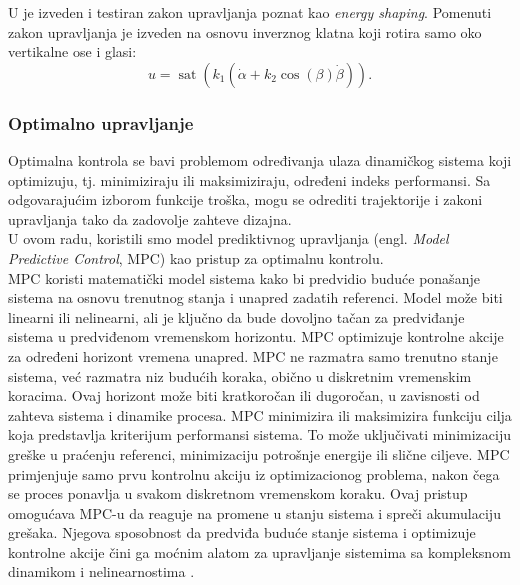 \documentclass[a4paper,11pt]{article}
\theoremstyle{definition} \newtheorem{deff}{Definicija}[section]
\theoremstyle{definition} \newtheorem{prim}[deff]{Primer}
\theoremstyle{plain} \newtheorem{teor}[deff]{Teorema}
\begin{document}
	U \cite{ener_shaping} je izveden i testiran zakon upravljanja poznat kao \textit{energy shaping}. Pomenuti zakon upravljanja je izveden na osnovu inverznog klatna koji rotira samo oko vertikalne ose i glasi: \\
	
	\begin{equation}
		u = \operatorname{sat}(k_1 (\dot\alpha + k_2 \cos(\beta) \dot\beta)).
	\end{equation}
	
	\subsubsection{Optimalno upravljanje}\label{sec:OU}
	Optimalna kontrola se bavi problemom određivanja ulaza dinamičkog sistema koji optimizuju, tj. minimiziraju ili maksimiziraju, određeni indeks performansi. Sa odgovarajućim izborom funkcije troška, mogu se odrediti trajektorije i zakoni upravljanja tako da zadovolje zahteve dizajna.\\
	
	U ovom radu, koristili smo model prediktivnog upravljanja (engl. \emph{Model Predictive Control}, MPC) kao pristup za optimalnu kontrolu. \\
	
	MPC koristi matematički model sistema kako bi predvidio buduće ponašanje sistema na osnovu trenutnog stanja i unapred zadatih referenci. Model može biti linearni ili nelinearni, ali je ključno da bude dovoljno tačan za predviđanje sistema u predviđenom vremenskom horizontu. MPC optimizuje kontrolne akcije za određeni horizont vremena unapred. MPC ne razmatra samo trenutno stanje sistema, već razmatra niz budućih koraka, obično u diskretnim vremenskim koracima. Ovaj horizont može biti kratkoročan ili dugoročan, u zavisnosti od zahteva sistema i dinamike procesa. MPC minimizira ili maksimizira funkciju cilja koja predstavlja kriterijum performansi sistema. To može uključivati minimizaciju greške u praćenju referenci, minimizaciju potrošnje energije ili slične ciljeve. MPC primjenjuje samo prvu kontrolnu akciju iz optimizacionog problema, nakon čega se proces ponavlja u svakom diskretnom vremenskom koraku. Ovaj pristup omogućava MPC-u da reaguje na promene u stanju sistema i spreči akumulaciju grešaka. Njegova sposobnost da predviđa buduće stanje sistema i optimizuje kontrolne akcije čini ga moćnim alatom za upravljanje sistemima sa kompleksnom dinamikom i nelinearnostima \cite{mpc}.\\
	
\end{document}
